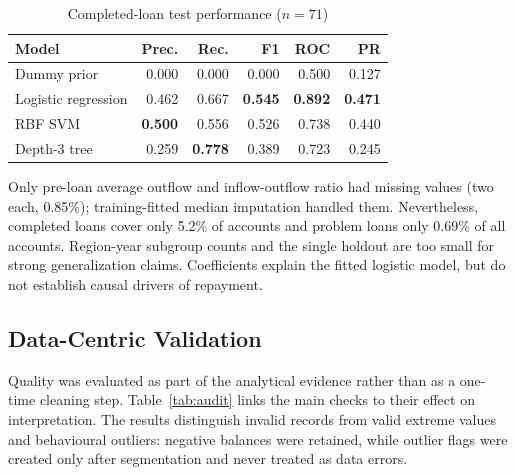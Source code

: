 \documentclass[conference]{IEEEtran}
\begin{document}
\begin{table}[t]
\caption{Completed-loan test performance ($n=71$)}
\label{tab:loan}
\centering
\footnotesize
\begin{tabular}{lrrrrr}
\toprule
\textbf{Model} & \textbf{Prec.} & \textbf{Rec.} & \textbf{F1} & \textbf{ROC} & \textbf{PR} \\
\midrule
Dummy prior & 0.000 & 0.000 & 0.000 & 0.500 & 0.127 \\
Logistic regression & 0.462 & 0.667 & \textbf{0.545} & \textbf{0.892} & \textbf{0.471} \\
RBF SVM & \textbf{0.500} & 0.556 & 0.526 & 0.738 & 0.440 \\
Depth-3 tree & 0.259 & \textbf{0.778} & 0.389 & 0.723 & 0.245 \\
\bottomrule
\end{tabular}
\end{table}

Only pre-loan average outflow and inflow-outflow ratio had missing values (two each, 0.85\%); training-fitted median imputation handled them. Nevertheless, completed loans cover only 5.2\% of accounts and problem loans only 0.69\% of all accounts. Region-year subgroup counts and the single holdout are too small for strong generalization claims. Coefficients explain the fitted logistic model, but do not establish causal drivers of repayment.

\subsection{Data-Centric Validation}

Quality was evaluated as part of the analytical evidence rather than as a one-time cleaning step. Table~\ref{tab:audit} links the main checks to their effect on interpretation. The results distinguish invalid records from valid extreme values and behavioural outliers: negative balances were retained, while outlier flags were created only after segmentation and never treated as data errors.
\end{document}
